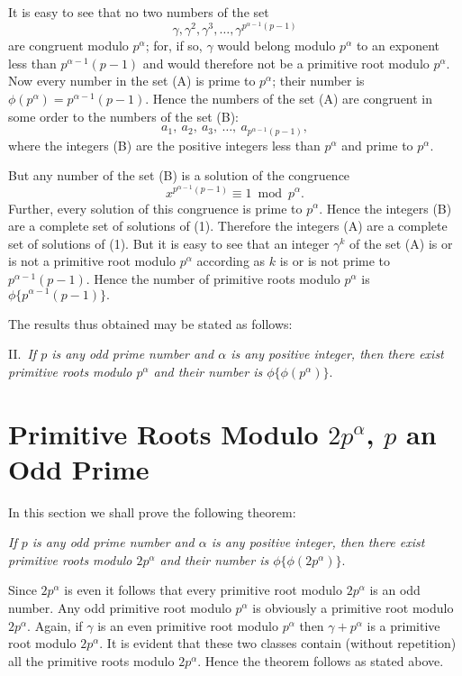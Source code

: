 \documentclass[oneside]{book}
\begin{document}
It is easy to see that no two numbers of the set
\begin{equation}
\gamma, \gamma^2, \gamma^3, \ldots, \gamma^{p^{\alpha-1}(p-1)}
\tag{A}
\end{equation}
are congruent modulo $p^\alpha$; for, if so, $\gamma$ would belong
modulo $p^\alpha$ to an exponent less than $p^{\alpha-1}(p-1)$ and
would therefore not be a primitive root modulo $p^\alpha$. Now every
number in the set (A) is prime to $p^\alpha$; their number is
$\phi(p^\alpha) = p^{\alpha -1}(p-1)$. Hence the numbers of the set
(A) are congruent in some order to the numbers of the set (B):
\begin{equation}
a_1,\ a_2,\ a_3,\ \ldots ,\ a_{p^{\alpha-1}(p-1)}, \tag{B}
\end{equation}
where the integers (B) are the positive integers less than
$p^\alpha$ and prime to $p^\alpha$.

But any number of the set (B) is a solution of the congruence
\begin{equation}
x^{p^{\alpha-1} (p-1)} \equiv 1 \bmod p^\alpha. \tag{1}
\end{equation}
Further, every solution of this congruence is prime to $p^\alpha$.
Hence the integers (B) are a complete set of solutions of (1).
Therefore the integers (A) are a complete set of solutions of (1).
But it is easy to see that an integer $\gamma^k$ of the set (A) is
or is not a primitive root modulo $p^\alpha$ according as $k$ is or
is not prime to $p^{\alpha-1} (p-1)$. Hence the number of primitive
roots modulo $p^\alpha$ is $\phi \{p^{\alpha-1} (p-1) \}.$

The results thus obtained may be stated as follows:

\smallskip II.~\emph{If $p$ is any odd prime number and $\alpha$ is
any positive integer, then there exist primitive roots modulo
$p^\alpha$ and their number is $\phi \{ \phi(p^\alpha) \}$}.

\section{Primitive Roots Modulo $2p^\alpha$, $p$ an Odd
Prime}\label{s37}

In this section we shall prove the following theorem:

\emph{If $p$ is any odd prime number and $\alpha$ is any positive
integer, then there exist primitive roots modulo $2p^\alpha$ and
their number is $\phi \{\phi(2 p^{\alpha} )\}.$}

Since $2 p^\alpha$ is even it follows that every primitive root
modulo $2 p^\alpha$ is an odd number. Any odd primitive root modulo
$p^\alpha$ is obviously a primitive root modulo $2p^\alpha$. Again,
if $\gamma$ is an even primitive root modulo $p^\alpha$ then $\gamma
+ p^\alpha$ is a primitive root modulo $2 p^\alpha$. It is evident
that these two classes contain (without repetition) all the
primitive roots modulo $2 p^\alpha$. Hence the theorem follows as
stated above.
\end{document}
